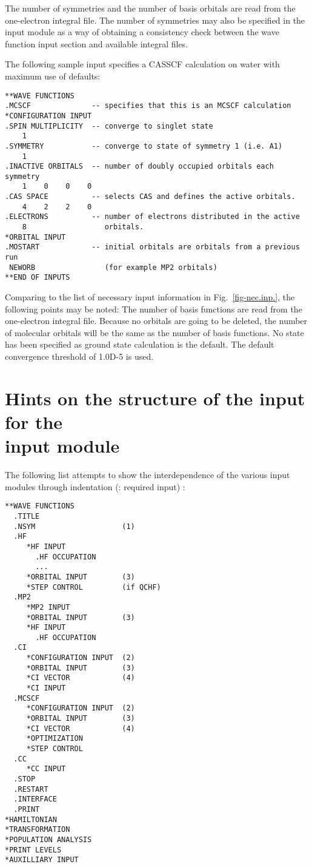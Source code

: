 \noindent
The number of symmetries and the number of basis orbitals are read from
the one-electron integral file.  The number of symmetries may also be
specified in the  input module as a way of
obtaining a consistency check between the wave function input section
and available integral files.

\noindent
The following sample input specifies a CASSCF
calculation on water with maximum use of defaults:

\begin{verbatim}
**WAVE FUNCTIONS
.MCSCF              -- specifies that this is an MCSCF calculation
*CONFIGURATION INPUT
.SPIN MULTIPLICITY  -- converge to singlet state
    1
.SYMMETRY           -- converge to state of symmetry 1 (i.e. A1)
    1
.INACTIVE ORBITALS  -- number of doubly occupied orbitals each symmetry
    1    0    0    0
.CAS SPACE          -- selects CAS and defines the active orbitals.
    4    2    2    0
.ELECTRONS          -- number of electrons distributed in the active
    8                  orbitals.
*ORBITAL INPUT
.MOSTART            -- initial orbitals are orbitals from a previous run
 NEWORB                (for example MP2 orbitals)
**END OF INPUTS
\end{verbatim}

\noindent
Comparing to the list of necessary input information in
Fig.~\ref{fig-nec.inp.},
the following points may be noted:
\noindent
The number of basis functions are read from the one-electron integral
file. Because no orbitals are going to be deleted, the number of
molecular orbitals will be the same as the number of basis functions.
\noindent
No state has been specified as ground state calculation is the default.
\noindent
The default convergence threshold of
1.0D-5 is used.


\clearpage
\section{\label{sec:ig_hints} Hints on the structure of the input for
the \\ input module}


The following list attempts to show the interdependence of the various
input modules through indentation
(: required input) :

\begin{verbatim}
**WAVE FUNCTIONS
  .TITLE
  .NSYM                    (1)
  .HF
     *HF INPUT
       .HF OCCUPATION
       ...
     *ORBITAL INPUT        (3)
     *STEP CONTROL         (if QCHF)
  .MP2
     *MP2 INPUT
     *ORBITAL INPUT        (3)
     *HF INPUT
       .HF OCCUPATION
  .CI
     *CONFIGURATION INPUT  (2)
     *ORBITAL INPUT        (3)
     *CI VECTOR            (4)
     *CI INPUT
  .MCSCF
     *CONFIGURATION INPUT  (2)
     *ORBITAL INPUT        (3)
     *CI VECTOR            (4)
     *OPTIMIZATION
     *STEP CONTROL
  .CC
     *CC INPUT
  .STOP
  .RESTART
  .INTERFACE
  .PRINT
*HAMILTONIAN
*TRANSFORMATION
*POPULATION ANALYSIS
*PRINT LEVELS
*AUXILLIARY INPUT
\end{verbatim}

